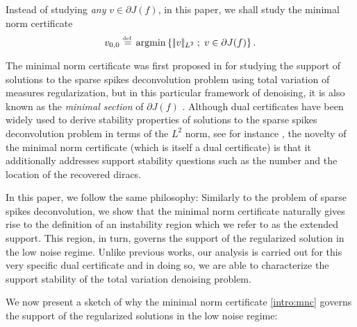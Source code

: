 Instead of studying \textit{any} $v\in \partial J(f)$, in this paper, we shall study the minimal norm certificate
\begin{equation}\label{intro:mnc}
v_{0,0} \stackrel{\mbox{\upshape\tiny def.}}{=} \mathop{\operatorname{argmin}}\left\{ |\!| v |\!|_{L^2} \;;\;  v\in\partial J(f) \right\}.
\end{equation}

The minimal norm certificate was first proposed in \cite{duvalpeyre13} for  studying the support of solutions to the sparse spikes deconvolution problem using total variation of measures regularization, but in this particular framework of denoising, it is also known as the \textit{minimal section} of $\partial J(f)$ \cite{scherzer2008variational}.
%
Although dual certificates have been widely used  to derive stability properties of solutions to the sparse spikes deconvolution problem in terms of the $L^2$ norm, see for instance \cite{Grasmair-cpam}, the novelty of the minimal norm certificate (which is itself a dual certificate) is that it additionally addresses support stability questions such as the number and the location of the recovered diracs.

In this paper, we  follow the same philosophy: Similarly to the problem of sparse spikes deconvolution, we show that the minimal norm certificate naturally gives rise to the definition of an instability region which we refer to as the extended support. This region, in turn, governs the support of the regularized solution in the low noise regime.
Unlike previous works, our analysis is carried out for this very specific dual certificate and in doing so, we are able to characterize the support stability of the total variation denoising problem.




We now present a sketch of why the minimal norm certificate \eqref{intro:mnc} governs the support of the regularized solutions in the low noise regime:

